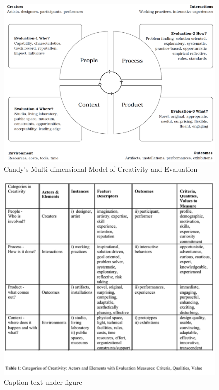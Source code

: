 \begin{figure}[!htb] %
  \centering
  \includegraphics{images/mmce.png}
\caption[Multi-dimensional Model of Creativity and Evaluation]{Candy's Multi-dimensional Model of Creativity and Evaluation}
\label{fig:mmce}
\end{figure}

\begin{figure}[!htb] %
  \centering
  \includegraphics{images/mmcetable.png}
\caption[Text for Table of Contents]{Caption text under figure}
\label{fig:mmcet}
\end{figure}


